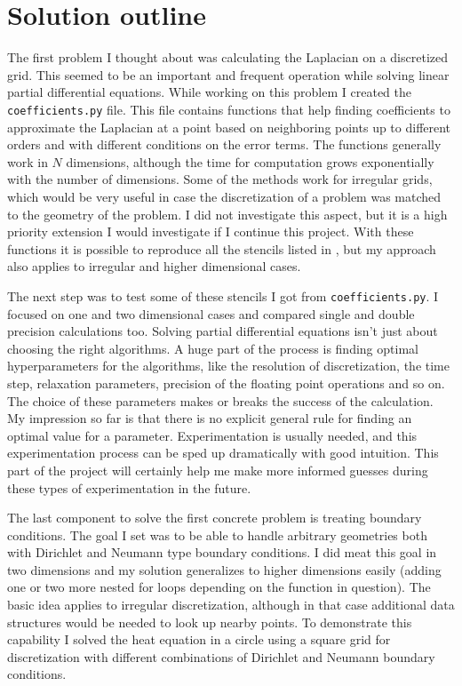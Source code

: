 \documentclass[pdftex,12pt,a4paper]{article}
\newcommand{\ctexttt}[1]{\colorbox{cverbbg}{\texttt{#1}}}
\begin{document}
	\section{Solution outline}
		The first problem I thought about was calculating the Laplacian on a discretized grid. This seemed to be an important and frequent operation while solving linear partial differential equations. While working on this problem I created the \ctexttt{coefficients.py} file. This file contains functions that help finding coefficients to approximate the Laplacian at a point based on neighboring points up to different orders and with different conditions on the error terms. The functions generally work in $N$ dimensions, although the time for computation grows exponentially with the number of dimensions. Some of the methods work for irregular grids, which would be very useful in case the discretization of a problem was matched to the geometry of the problem. I did not investigate this aspect, but it is a high priority extension I would investigate if I continue this project. With these functions it is possible to reproduce all the stencils listed in \cite{patra}, but my approach also applies to irregular and higher dimensional cases.
		
		The next step was to test some of these stencils I got from \ctexttt{coefficients.py}. I focused on one and two dimensional cases and compared single and double precision calculations too. Solving partial differential equations isn't just about choosing the right algorithms. A huge part of the process is finding optimal hyperparameters for the algorithms, like the resolution of discretization, the time step, relaxation parameters, precision of the floating point operations and so on. The choice of these parameters makes or breaks the success of the calculation. My impression so far is that there is no explicit general rule for finding an optimal value for a parameter. Experimentation is usually needed, and this experimentation process can be sped up dramatically with good intuition. This part of the project will certainly help me make more informed guesses during these types of experimentation in the future.
		
		The last component to solve the first concrete problem is treating boundary conditions. The goal I set was to be able to handle arbitrary geometries both with Dirichlet and Neumann type boundary conditions. I did meat this goal in two dimensions and my solution generalizes to higher dimensions easily (adding one or two more nested for loops depending on the function in question). The basic idea applies to irregular discretization, although in that case additional data structures would be needed to look up nearby points. To demonstrate this capability I solved the heat equation in a circle using a square grid for discretization with different combinations of Dirichlet and Neumann boundary conditions. \cite{Gaussian,conduction}
\end{document}
